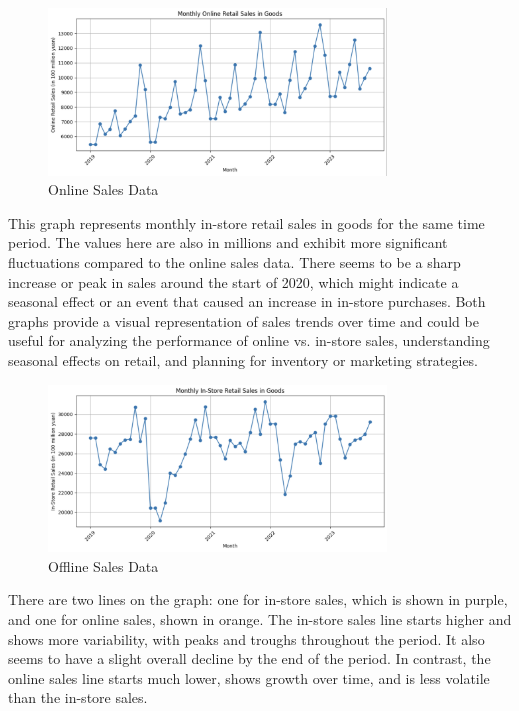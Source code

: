 \documentclass{article}
\begin{document}
\begin{figure}[h]
  \centering
  \includegraphics[width=0.8\textwidth]{online_sales_data.png}
  \caption{Online Sales Data}
  \label{fig:yourlabel}
\end{figure}

This graph represents monthly in-store retail sales in goods for the same time period.
The values here are also in millions and exhibit more significant fluctuations compared to the online sales data.
There seems to be a sharp increase or peak in sales around the start of 2020, which might indicate a seasonal effect or an event that caused an increase in in-store purchases.
Both graphs provide a visual representation of sales trends over time and could be useful for analyzing the performance of online vs. in-store sales, understanding seasonal effects on retail, and planning for inventory or marketing strategies.

\begin{figure}[h]
  \centering
  \includegraphics[width=0.8\textwidth]{offline_sales_data.png}
  \caption{Offline Sales Data}
  \label{fig:yourlabel}
\end{figure}

There are two lines on the graph: one for in-store sales, which is shown in purple, and one for online sales, shown in orange. The in-store sales line starts higher and shows more variability, with peaks and troughs throughout the period. It also seems to have a slight overall decline by the end of the period. In contrast, the online sales line starts much lower, shows growth over time, and is less volatile than the in-store sales.
\end{document}
